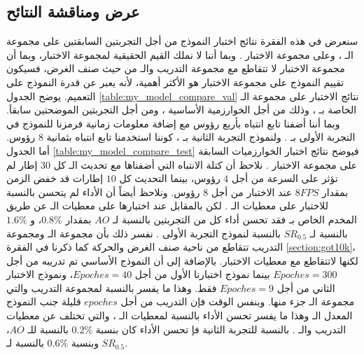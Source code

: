 \subsection{عرض ومناقشة النتائح}
سنعرض في هذه الفقرة نتائج اختبار النموذج من أجل التجربتين السابقتين على مجموعة الـ
،
وعلى مجموعة الاختبار 
.
وبما أننا لا نملك القيم الحقيقية لمجموعة الاختبار، وبما أن مجموعة الاختبار لا تتقاطع مع مجموعة التدريب والـ 
من حيث صنف الغرض، فسيكون تقييم النموذج على مجموعة الاختبار هو الأكثر أهمية، لأنه يعبر عن قدرة النموذج على التعميم.
\newline
يوضح الجدول
\ref{table:my_model_compare_val}
نتائج الاختبار على مجموعة الـ
الخاصة بـ
،
وذلك من أجل الخوارزمية الأساسية 
،
ومن أجل التجربتين الموضحتين سابقاَ. وبما أننا أضفنا تابع انتباه بأربع رؤوس مع إضافة معلومات زمانية فرمزنا للنموذج في التجربة الأولى بـ
.
ولنموذج التجربة الثانية بـ 
،
كوننا استخدمنا تابع انتباه بثمانية
$8$
رؤوس.
أما الجدول 
\ref{table:my_model_compare_test}
فيوضح نتائج اختبار الخوارزميات السابقة على مجموعة الاختبار 
.
\newline
نلاحظ أن كتلة الانتباه التي أضفناها مع تحديث الـ
كل 
$30$
إطار لم تؤثر على السرعة من أجل $4$ رؤوس، بينما التحديث كل 
$10$
إطارات قد خفض الزمن بمقدار 
$8FPS$
عند الاختبار من أجل
$8$
رؤوس.
ونلاحظ أيضاً أن الأداء لم يتحسن بالنسبة للاختبار على معطيات الـ
.
لكن بالمقابل عند اختبارها على معطيات الـ
عن طريق المخدم الخاص بـ
فقد تحسن أداء كل من التجربتين بالنسبة لـ
$AO$
بمقدار
$0.8\%$،
و
$1.6\%$
بالنسبة لـ
$SR_{0.5}$
بالنسبة لنموذج التجربة الأولى
.
نفسر ذلك بأن مجموعة الـ
ومجموعة التدريب تتقاطع من ناحية صنف الغرض والحركة كما ذكرنا في الفقرة
\ref{section:got10k}،
لكنها لاتتقاطع مع معطيات الاختبار.
بالإضافة إلى أن النموذج الأساسي تم تدريبه من أجل 
$Epoches = 300$
بينما نموذج اختبارنا الأول من أجل 
$Epoches = 40$،
ونموذج الاختبار الثاني من أجل 
$Epoches = 9$ 
فقط. وهذا ما يفسر 
بالنسبة لمجموعة التدريب والتي مجموعة الـ
جزء منها.
وبنفس الوقت فإن التدريب من أجل 
$epoches$
قليلة جنب النموذج المعدل الـ
وهذا ما يفسر تحسن الأداء بالنسبة لمعطيات الـ
،
والتي تختلف عن معطيات التدريب والـ
.
\newline
بالنسبة للتجربة الثانية فإ تحسن الأداء كان بنسبة 
$0.2\%$
بالنسبة للـ
$AO$،
وبنسبة 
$0.6\%$
بالنسبة لـ
$SR_{0.5}$.
